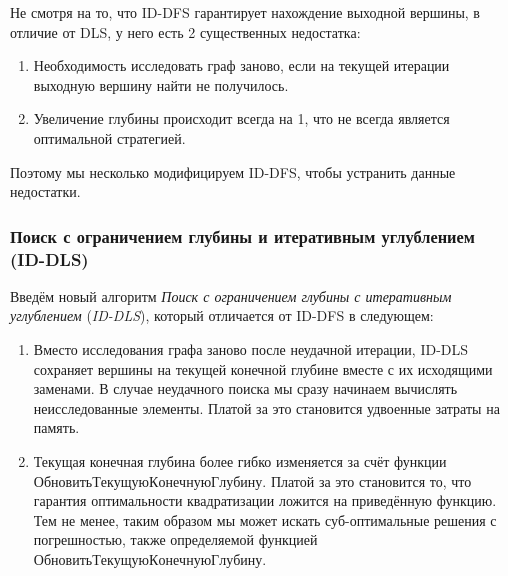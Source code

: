 Не смотря на то, что ID-DFS гарантирует нахождение выходной вершины, в отличие от DLS, у него есть 2  существенных недостатка:
\begin{enumerate}
    \item Необходимость исследовать граф заново, если на текущей итерации выходную вершину найти не получилось.
    \item Увеличение глубины происходит всегда на 1, что не всегда является оптимальной стратегией.
\end{enumerate}

Поэтому мы несколько модифицируем ID-DFS, чтобы устранить данные недостатки.

\subsubsection{Поиск с ограничением глубины и итеративным углублением (ID-DLS)} \label{sec:ID-DLS}

\begin{definition}
   Введём новый алгоритм \textit{Поиск с ограничением глубины с итеративным углублением} (\textit{ID-DLS}), который отличается от ID-DFS в следующем:

    \begin{enumerate}
        \item Вместо исследования графа заново после неудачной итерации, ID-DLS сохраняет вершины на текущей конечной глубине вместе с их исходящими заменами. В случае неудачного поиска мы сразу начинаем вычислять неисследованные элементы. Платой за это становится удвоенные затраты на память.
        \item Текущая конечная глубина более гибко изменяется за счёт функции $ОбновитьТекущуюКонечнуюГлубину$. Платой за это становится то, что гарантия оптимальности квадратизации ложится на приведённую функцию. Тем не менее, таким образом мы может искать суб-оптимальные решения с погрешностью, также определяемой функцией $ОбновитьТекущуюКонечнуюГлубину$.
    \end{enumerate} 
\end{definition}


